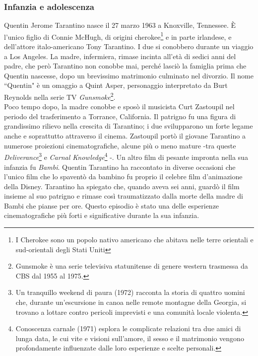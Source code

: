 \documentclass[12pt]{article} %
\begin{document}
\subsubsection{Infanzia e adolescenza}
\begin{flushleft}
    Quentin Jerome Tarantino nasce il 27 marzo 1963 a Knoxville, Tennessee. 
    È l'unico figlio di Connie McHugh, di origini cherokee\footnote{I Cherokee sono un popolo nativo americano che abitava nelle terre orientali e sud-orientali degli Stati Uniti} 
    e in parte irlandese, e dell'attore italo-americano Tony Tarantino. I due si conobbero durante un viaggio a Los Angeles. La madre, infermiera, rimase incinta all'età di sedici anni del padre, che però Tarantino non conobbe mai, perché lasciò la famiglia prima che Quentin nascesse, dopo un brevissimo matrimonio culminato nel divorzio.
    Il nome ``Quentin" è un omaggio a Quint Asper, personaggio interpretato da Burt Reynolds nella serie TV \textit{Gunsmoke}\footnote{Gunsmoke è una serie televisiva statunitense di genere western trasmessa da CBS dal 1955 al 1975.}.\\
    Poco tempo dopo, la madre conobbe e sposò il musicista Curt Zastoupil nel periodo del trasferimento a Torrance, California. Il patrigno fu una figura di grandissimo rilievo nella crescita di Tarantino; i due svilupparono un forte legame anche e soprattutto attraverso il cinema. 
    Zastoupil portò il giovane Tarantino a numerose proiezioni cinematografiche, alcune più o meno mature -tra queste \textit{Deliverance}\footnote{Un tranquillo weekend di paura (1972) racconta la storia di quattro uomini che, durante un'escursione in canoa nelle remote montagne della Georgia, si trovano a lottare contro pericoli imprevisti e una comunità locale violenta.}  
    e \textit{Carnal Knowledge}\footnote{Conoscenza carnale (1971) esplora le complicate relazioni tra due amici di lunga data, le cui vite e visioni sull'amore, il sesso e il matrimonio vengono profondamente influenzate dalle loro esperienze e scelte personali.} -.
    Un altro film di pesante impronta nella sua infanzia fu \textit{Bambi}. Quentin Tarantino ha raccontato in diverse occasioni che l'unico film che lo spaventò da bambino fu 
    proprio il celebre film d'animazione della Disney. Tarantino ha spiegato che, quando aveva sei anni, guardò il film insieme al suo patrigno e rimase così traumatizzato dalla morte della madre di Bambi che pianse per ore. Questo episodio è stato una delle esperienze cinematografiche più forti e significative durante la sua infanzia. \\\vspace{1cm}

\end{flushleft}
\end{document}
